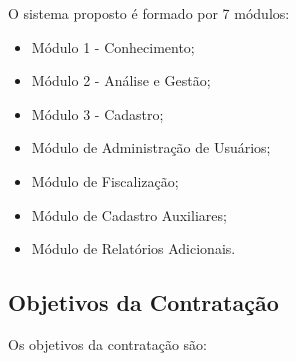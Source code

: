 O sistema proposto é formado por 7 módulos:

\begin{itemize}
\item Módulo 1 - Conhecimento;
\item Módulo 2 - Análise e Gestão;
\item Módulo 3 - Cadastro;
\item Módulo de Administração de Usuários;
\item Módulo de Fiscalização;
\item Módulo de Cadastro Auxiliares;
\item Módulo de Relatórios Adicionais.
\end{itemize}

\subsection[Objetivos da Contratação]{Objetivos da Contratação}

Os objetivos da contratação são:

